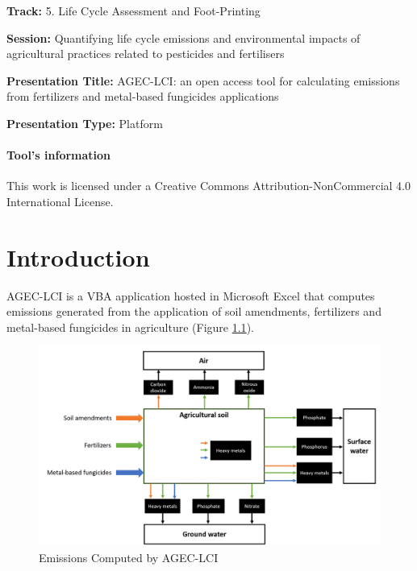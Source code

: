\documentclass[openany]{book}
\begin{document}
\textbf{Track:} 5. Life Cycle Assessment and Foot-Printing

\textbf{Session:} Quantifying life cycle emissions and environmental impacts of agricultural practices related to pesticides and fertilisers

\textbf{Presentation Title:} AGEC-LCI: an open access tool for calculating emissions from fertilizers and metal-based fungicides applications

\textbf{Presentation Type:} Platform

\hypertarget{tools-information}{%
\subsubsection*{Tool's information}\label{tools-information}}

This work is licensed under a Creative Commons Attribution-NonCommercial 4.0 International License.

\hypertarget{introduction}{%
\chapter{Introduction}\label{introduction}}

AGEC-LCI is a VBA application hosted in Microsoft Excel that computes emissions generated from the application of soil amendments, fertilizers and metal-based fungicides in agriculture (Figure \ref{fig:agec-lci-emissions}).

\begin{figure}[ht]

{\centering \includegraphics[width=0.95\linewidth]{Figures/agec_lci_emissions} 

}

\caption{Emissions Computed by AGEC-LCI}\label{fig:agec-lci-emissions}
\end{figure}
\end{document}
